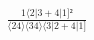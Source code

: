 \documentclass[varwidth, border=5pt]{standalone}
\begin{document}
\begin{my}
$\begin{gathered}
\scriptscriptstyle\frac{1⟨2|3+4|1]²}{⟨24⟩⟨34⟩⟨3|2+4|1]}
\end{gathered}$
\end{my}
\end{document}
